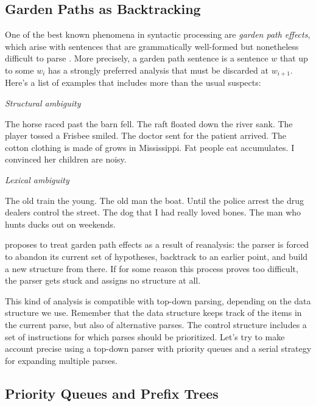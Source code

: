 \subsection{Garden Paths as Backtracking}
\label{sub:TopDownEval_Frazier}
One of the best known phenomena in syntactic processing are \emph{garden path effects}, which arise with sentences that are grammatically well-formed but nonetheless difficult to parse \citep{Frazier79, FrazierRayner82}.
More precisely, a garden path sentence is a sentence $w$ that up to some $w_i$ has a strongly preferred analysis that must be discarded at $w_{i+1}$. 
Here's a list of examples that includes more than the usual suspects:
%
\begin{exe}
    \ex \emph{Structural ambiguity}
    \begin{xlist}
        \ex The horse raced past the barn fell.
        \ex The raft floated down the river sank.
        \ex The player tossed a Frisbee smiled.
        \ex The doctor sent for the patient arrived.
        \ex The cotton clothing is made of grows in Mississippi.
        \ex Fat people eat accumulates.
        \ex I convinced her children are noisy.
    \end{xlist}
    \ex \emph{Lexical ambiguity}
    \begin{xlist}
        \ex The old train the young.
        \ex The old man the boat.
        \ex Until the police arrest the drug dealers control the street.
        \ex The dog that I had really loved bones.
        \ex The man who hunts ducks out on weekends.
    \end{xlist}
\end{exe}

\citet{Frazier79} proposes to treat garden path effects as a result of reanalysis: the parser is forced to abandon its current set of hypotheses, backtrack to an earlier point, and build a new structure from there.
If for some reason this process proves too difficult, the parser gets stuck and assigns no structure at all.

This kind of analysis is compatible with top-down parsing, depending on the data structure we use.
Remember that the data structure keeps track of the items in the current parse, but also of alternative parses.
The control structure includes a set of instructions for which parses should be prioritized.
Let's try to make  account precise using a top-down parser with priority queues and a serial strategy for expanding multiple parses.

\subsection{Priority Queues and Prefix Trees}
\label{sub:TopDownEval_PriorityQueues}


